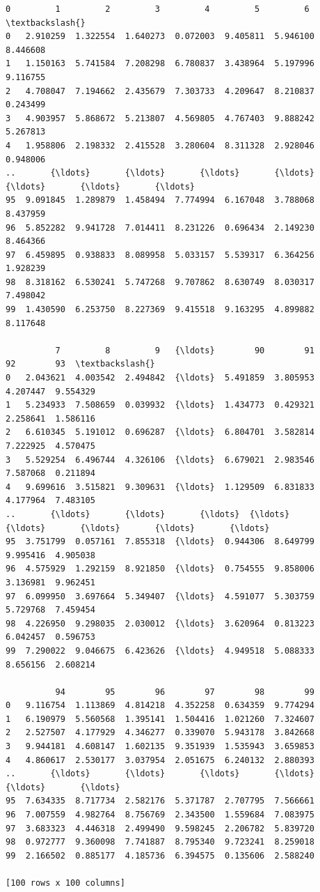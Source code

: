 \documentclass[11pt]{article}
\makeatletter
\newcommand{\boxspacing}{\kern\kvtcb@left@rule\kern\kvtcb@boxsep}
\newcommand{\prompt}[4]{
        \ttfamily\llap{{\color{#2}[#3]:\hspace{3pt}#4}}\vspace{-\baselineskip}
    }
\makeatother
\begin{document}
            \begin{tcolorbox}[breakable, size=fbox, boxrule=.5pt, pad at break*=1mm, opacityfill=0]
\prompt{Out}{outcolor}{3}{\boxspacing}
\begin{Verbatim}[commandchars=\\\{\}]
          0         1         2         3         4         5         6   \textbackslash{}
0   2.910259  1.322554  1.640273  0.072003  9.405811  5.946100  8.446608
1   1.150163  5.741584  7.208298  6.780837  3.438964  5.197996  9.116755
2   4.708047  7.194662  2.435679  7.303733  4.209647  8.210837  0.243499
3   4.903957  5.868672  5.213807  4.569805  4.767403  9.888242  5.267813
4   1.958806  2.198332  2.415528  3.280604  8.311328  2.928046  0.948006
..       {\ldots}       {\ldots}       {\ldots}       {\ldots}       {\ldots}       {\ldots}       {\ldots}
95  9.091845  1.289879  1.458494  7.774994  6.167048  3.788068  8.437959
96  5.852282  9.941728  7.014411  8.231226  0.696434  2.149230  8.464366
97  6.459895  0.938833  8.089958  5.033157  5.539317  6.364256  1.928239
98  8.318162  6.530241  5.747268  9.707862  8.630749  8.030317  7.498042
99  1.430590  6.253750  8.227369  9.415518  9.163295  4.899882  8.117648

          7         8         9   {\ldots}        90        91        92        93  \textbackslash{}
0   2.043621  4.003542  2.494842  {\ldots}  5.491859  3.805953  4.207447  9.554329
1   5.234933  7.508659  0.039932  {\ldots}  1.434773  0.429321  2.258641  1.586116
2   6.610345  5.191012  0.696287  {\ldots}  6.804701  3.582814  7.222925  4.570475
3   5.529254  6.496744  4.326106  {\ldots}  6.679021  2.983546  7.587068  0.211894
4   9.699616  3.515821  9.309631  {\ldots}  1.129509  6.831833  4.177964  7.483105
..       {\ldots}       {\ldots}       {\ldots}  {\ldots}       {\ldots}       {\ldots}       {\ldots}       {\ldots}
95  3.751799  0.057161  7.855318  {\ldots}  0.944306  8.649799  9.995416  4.905038
96  4.575929  1.292159  8.921850  {\ldots}  0.754555  9.858006  3.136981  9.962451
97  6.099950  3.697664  5.349407  {\ldots}  4.591077  5.303759  5.729768  7.459454
98  4.226950  9.298035  2.030012  {\ldots}  3.620964  0.813223  6.042457  0.596753
99  7.290022  9.046675  6.423626  {\ldots}  4.949518  5.088333  8.656156  2.608214

          94        95        96        97        98        99
0   9.116754  1.113869  4.814218  4.352258  0.634359  9.774294
1   6.190979  5.560568  1.395141  1.504416  1.021260  7.324607
2   2.527507  4.177929  4.346277  0.339070  5.943178  3.842668
3   9.944181  4.608147  1.602135  9.351939  1.535943  3.659853
4   4.860617  2.530177  3.037954  2.051675  6.240132  2.880393
..       {\ldots}       {\ldots}       {\ldots}       {\ldots}       {\ldots}       {\ldots}
95  7.634335  8.717734  2.582176  5.371787  2.707795  7.566661
96  7.007559  4.982764  8.756769  2.343500  1.559684  7.083975
97  3.683323  4.446318  2.499490  9.598245  2.206782  5.839720
98  0.972777  9.360098  7.741887  8.795340  9.723241  8.259018
99  2.166502  0.885177  4.185736  6.394575  0.135606  2.588240

[100 rows x 100 columns]
\end{Verbatim}
\end{tcolorbox}
        
\end{document}
